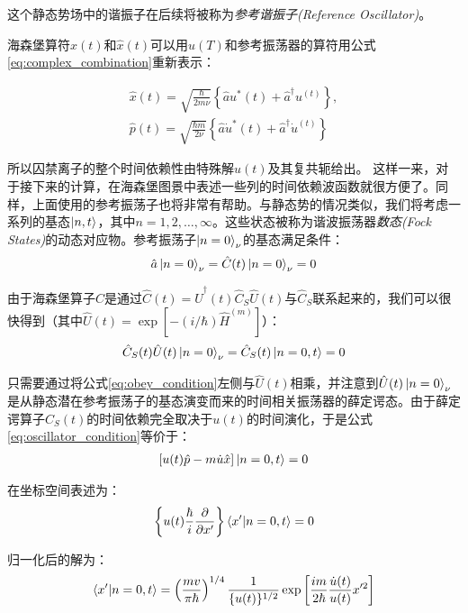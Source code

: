 这个静态势场中的谐振子在后续将被称为\emph{参考谐振子(Reference Oscillator)}。

海森堡算符$\hat{x}(t)$和$\hat{x}(t)$可以用$u(T)$和参考振荡器的算符用公式\eqref{eq:complex_combination}重新表示：

\begin{align}
    \hat{x}(t)=\sqrt{\frac{\hbar}{2m\nu}}\left\{\hat{a}u^*(t)+\hat{a}^\dagger u^(t)\right\},\\
    \hat{p}(t)=\sqrt{\frac{\hbar m}{2\nu}}\left\{\hat{a}\dot{u}^*(t)+\hat{a}^\dagger \dot{u}^(t)\right\}
\end{align}

所以囚禁离子的整个时间依赖性由特殊解$u(t)$及其复共轭给出。
这样一来，对于接下来的计算，在海森堡图景中表述一些列的时间依赖波函数就很方便了。同样，上面使用的参考振荡子也将非常有帮助。与静态势的情况类似，我们将考虑一系列的基态$\ket{n,t}$，其中$n=1,2,\dots,\infty$。这些状态被称为谐波振荡器\emph{数态(Fock States)}的动态对应物。参考振荡子$\ket{n=0}_\nu$的基态满足条件：
\begin{align}
    \hat{a}\ket{n=0}_\nu=\hat{C}(t)\ket{n=0}_\nu=0 \label{eq:obey_condition}
\end{align}

由于海森堡算子$\hat{C}$是通过$\hat{C}(t)=\hat{U}^\dagger(t)\hat{C}_S\hat{U}(t)$与$\hat{C}_S$联系起来的，我们可以很快得到（其中$\hat{U}(t)=\exp{\left[-(i/\hbar)\hat{H}^{(m)}\right]}$）：
\begin{align}
    \hat{C}_S(t)\hat{U}(t)\ket{n=0}_\nu=\hat{C}_S(t)\ket{n=0,t}=0 \label{eq:oscillator_condition}
\end{align}

只需要通过将公式\eqref{eq:obey_condition}左侧与$\hat{U}(t)$相乘，并注意到$\hat{U}(t)\ket{n=0}_\nu$是从静态潜在参考振荡子的基态演变而来的时间相关振荡器的薛定谔态。由于薛定谔算子$C_S(t)$的时间依赖完全取决于$u(t)$的时间演化，于是公式\eqref{eq:oscillator_condition}等价于：
\begin{align}
    \left[u(t)\hat{p}-m\dot{u}\hat{x}\right]\ket{n=0,t}=0
\end{align}

在坐标空间表述为：
\begin{align}
    \left\{u(t)\frac{\hbar}{i}\frac{\partial}{\partial x'}\right\}\braket{x'|n=0,t}=0
\end{align}

归一化后的解为：
\begin{align}
    \braket{x'|n=0,t}=\left(\frac{mv}{\pi\hbar}\right)^{1/4}\frac{1}{\{u(t)\}^{1/2}}\exp\left[\frac{i m}{2\hbar}\frac{\dot{u}(t)}{u(t)}x'^2\right]
\end{align}

